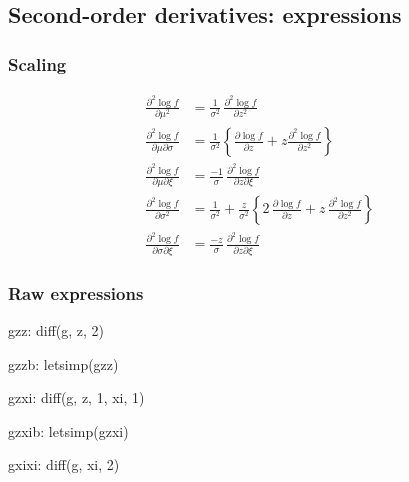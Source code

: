 \subsection{Second-order derivatives: expressions}
\subsubsection*{Scaling}
{\color{red}
\begin{align*}
  \frac{\partial^2 \log f}{\partial \mu^2}
  &= \frac{1}{\sigma^2} \,
    \frac{\partial^2 \log f}{\partial z^2} \\
  \frac{\partial^2 \log f}{\partial \mu \partial \sigma}
  &= \frac{1}{\sigma^2} \left\{
    \frac{\partial \log f}{\partial z} + z
    \frac{\partial^2 \log f}{\partial z^2}
   \right\}\\
  \frac{\partial^2 \log f}{\partial \mu \partial \xi}
  &= \frac{-1}{\sigma} \,
    \frac{\partial^2 \log f}{\partial z \partial \xi}\\
  \frac{\partial^2 \log f}{\partial \sigma^2}
  &= \frac{1}{\sigma^2} +
    \frac{z}{\sigma^2} \left\{
    2 \, \frac{\partial \log f}{\partial z}  +
    z \,
    \frac{\partial^2 \log f}{\partial z^2}
    \right\}\\
  \frac{\partial^2 \log f}{\partial \sigma \partial \xi}
  &= \frac{-z}{\sigma} \,
    \frac{\partial^2 \log f}{\partial z \partial \xi} 
\end{align*}
}

\subsubsection*{Raw expressions}
\begin{maxima}
  gzz: diff(g, z, 2)
\end{maxima}%

\begin{maxima}
  gzzb: letsimp(gzz)
\end{maxima}%

\begin{maxima}
  gzxi: diff(g, z, 1, xi, 1)
\end{maxima}%

\begin{maxima}
  gzxib: letsimp(gzxi)
\end{maxima}%

\begin{maxima}
  gxixi: diff(g, xi, 2)
\end{maxima}%

